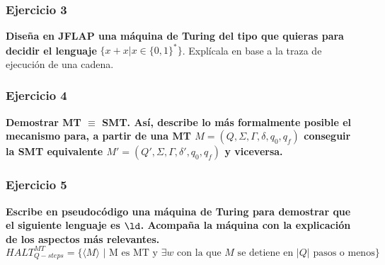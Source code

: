 \documentclass{article}
\begin{document}
%

\subsubsection*{Ejercicio 3} \textbf{Diseña en JFLAP una máquina de Turing del tipo que quieras para decidir el lenguaje} $\{x+x |x\in\{0,1\}^*\}$. Explícala en base a la traza de ejecución de una cadena.


\subsubsection*{Ejercicio 4} \textbf{Demostrar MT $\equiv$ SMT. Así, describe lo más formalmente posible  el mecanismo para, a partir de una MT $M=(Q,\Sigma,\Gamma,\delta,q_0,q_f)$ conseguir la SMT equivalente $M'=(Q',\Sigma,\Gamma,\delta',q_0,q_f)$ y viceversa.}
%
%
%


\subsubsection*{Ejercicio 5} \textbf{Escribe en pseudocódigo una máquina de Turing para demostrar que el siguiente lenguaje es $\ld$. Acompaña la máquina con la explicación de  los aspectos más relevantes.}
$$HALT_{Q-steps}^{MT}=\{\langle M \rangle \mbox{ | M es MT y } \exists w \mbox{ con la que } M \mbox{ se detiene en }|Q| \mbox{ pasos o menos}  \}$$
\end{document}
